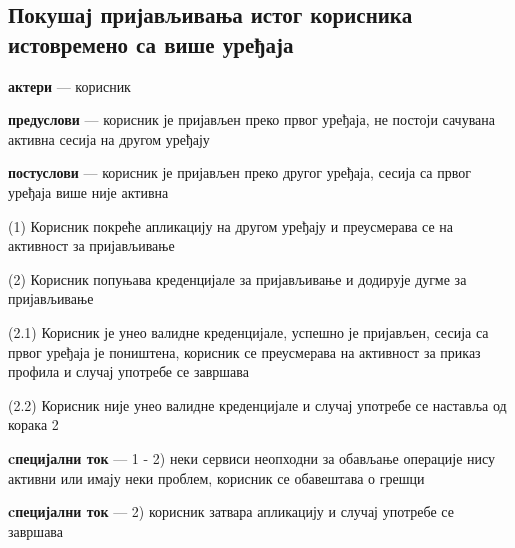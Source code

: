 \documentclass[12pt,oneside]{memoir}
\begin{document}
\subsection{Покушај пријављивања истог корисника истовремено са више уређаја}
\begin{description}
    \item \textbf{актери} --- корисник
    \item \textbf{предуслови} --- корисник је пријављен преко првог уређаја, не постоји сачувана активна сесија на другом уређају
    \item \textbf{постуслови} --- корисник је пријављен преко другог уређаја, сесија са првог уређаја више није активна
    \item (1) Корисник покреће апликацију на другом уређају и преусмерава се на активност за пријављивање
    \item (2) Корисник попуњава креденцијале за пријављивање и додирује дугме за пријављивање
    \begin{description}
        \item (2.1) Корисник је унео валидне креденцијале, успешно је пријављен, сесија са првог уређаја је поништена, корисник се преусмерава на активност за приказ профила и случај употребе се завршава
        \item (2.2) Корисник није унео валидне креденцијале и случај употребе се наставља од корака 2
    \end{description}
    \item \textbf{cпецијални ток} --- 1 - 2) неки сервиси неопходни за обављање операције нису активни или имају неки проблем, корисник се обавештава о грешци
    \item \textbf{cпецијални ток} --- 2) корисник затвара апликацију и случај употребе се завршава 
\end{description}
\end{document}
